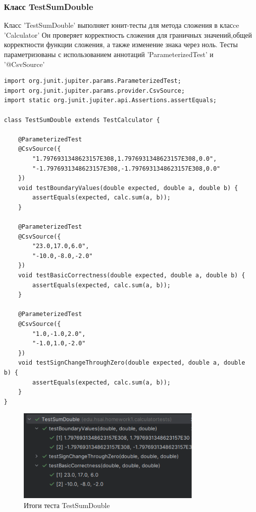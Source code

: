 \documentclass[areasetadvanced]{scrartcl}
\begin{document}
\subsubsection{Класс TestSumDouble}
Класс 'TestSumDouble' выполняет юнит-тесты для метода сложения в класce 'Calculator'
Он проверяет корректность сложения для граничных значений,общей корректности функции сложения, а также изменение знака через ноль. Тесты параметризованы с использованием аннотаций 'ParameterizedTest' и '@CsvSource'
\begin{lstlisting}[caption={Класс TestSumDouble}]
import org.junit.jupiter.params.ParameterizedTest;
import org.junit.jupiter.params.provider.CsvSource;
import static org.junit.jupiter.api.Assertions.assertEquals;

class TestSumDouble extends TestCalculator {

    @ParameterizedTest
    @CsvSource({
        "1.7976931348623157E308,1.7976931348623157E308,0.0",
        "-1.7976931348623157E308,-1.7976931348623157E308,0.0"
    })
    void testBoundaryValues(double expected, double a, double b) {
        assertEquals(expected, calc.sum(a, b));
    }

    @ParameterizedTest
    @CsvSource({
        "23.0,17.0,6.0",
        "-10.0,-8.0,-2.0"
    })
    void testBasicCorrectness(double expected, double a, double b) {
        assertEquals(expected, calc.sum(a, b));
    }

    @ParameterizedTest
    @CsvSource({
        "1.0,-1.0,2.0",
        "-1.0,1.0,-2.0"
    })
    void testSignChangeThroughZero(double expected, double a, double b) {
        assertEquals(expected, calc.sum(a, b));
    }
}
\end{lstlisting}
\begin{figure}[H]
	\centering
	\includegraphics[width=0.8\textwidth]{images/TestSumDouble.png}
	\caption{Итоги теста TestSumDouble}
	\label{fig:syntdiag}
\end{figure}
\end{document}
